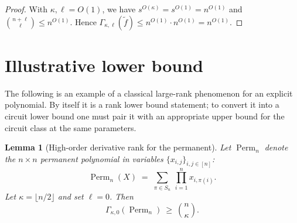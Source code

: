 \documentclass[12pt]{article}
\newtheorem{lemma}[theorem]{Lemma}
\theoremstyle{definition}
\theoremstyle{remark}
\newcommand{\rankSPDP}{\Gamma}
\DeclareMathOperator{\Perm}{Perm}
\begin{document}
\begin{proof}
With $\kappa,\ell=O(1)$, we have $s^{O(\kappa)}=s^{O(1)}=n^{O(1)}$ and
$\binom{n+\ell}{\ell}\le n^{O(1)}$. Hence
$\rankSPDP_{\kappa,\ell}(\tilde f)\le n^{O(1)}\cdot n^{O(1)}=n^{O(1)}$.
\end{proof}

\section{Illustrative lower bound}
\label{sec:example-lower}

The following is an example of a classical large-rank phenomenon for an explicit polynomial.
By itself it is a rank lower bound statement; to convert it into a circuit lower bound one
must pair it with an appropriate upper bound for the circuit class at the same parameters.

\begin{lemma}[High-order derivative rank for the permanent]
\label{lem:perm-high-order-der-rank}
Let $\Perm_n$ denote the $n\times n$ permanent polynomial in variables
$\{x_{i,j}\}_{i,j\in[n]}$:
\[
\Perm_n(X) \;=\; \sum_{\pi\in S_n}\ \prod_{i=1}^n x_{i,\pi(i)}.
\]
Let $\kappa=\lfloor n/2\rfloor$ and set $\ell=0$. Then
\[
\Gamma_{\kappa,0}(\Perm_n)\ \ge\ \binom{n}{\kappa}.
\]
\end{lemma}
\end{document}

